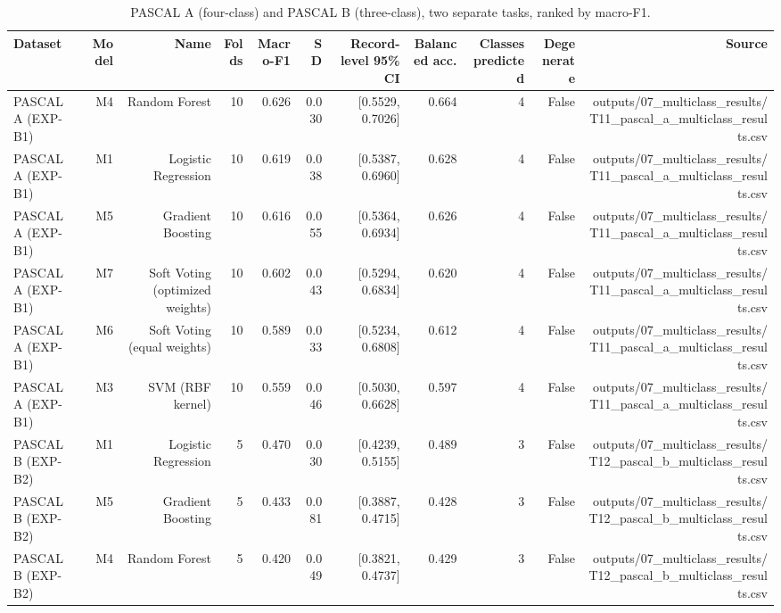 \begin{table}[htbp]
  \centering
  \caption{PASCAL A (four-class) and PASCAL B (three-class), two separate tasks, ranked by macro-F1.}
  \label{tab:q1_t07}
  \begin{tabular}{lrrrrrrrrrr}
    \toprule
    Dataset & Model & Name & Folds & Macro-F1 & SD & Record-level 95\% CI & Balanced acc. & Classes predicted & Degenerate & Source \\
    \midrule
    PASCAL A (EXP-B1) & M4 & Random Forest & 10 & 0.626 & 0.030 & [0.5529, 0.7026] & 0.664 & 4 & False & outputs/07\_multiclass\_results/T11\_pascal\_a\_multiclass\_results.csv \\
    PASCAL A (EXP-B1) & M1 & Logistic Regression & 10 & 0.619 & 0.038 & [0.5387, 0.6960] & 0.628 & 4 & False & outputs/07\_multiclass\_results/T11\_pascal\_a\_multiclass\_results.csv \\
    PASCAL A (EXP-B1) & M5 & Gradient Boosting & 10 & 0.616 & 0.055 & [0.5364, 0.6934] & 0.626 & 4 & False & outputs/07\_multiclass\_results/T11\_pascal\_a\_multiclass\_results.csv \\
    PASCAL A (EXP-B1) & M7 & Soft Voting (optimized weights) & 10 & 0.602 & 0.043 & [0.5294, 0.6834] & 0.620 & 4 & False & outputs/07\_multiclass\_results/T11\_pascal\_a\_multiclass\_results.csv \\
    PASCAL A (EXP-B1) & M6 & Soft Voting (equal weights) & 10 & 0.589 & 0.033 & [0.5234, 0.6808] & 0.612 & 4 & False & outputs/07\_multiclass\_results/T11\_pascal\_a\_multiclass\_results.csv \\
    PASCAL A (EXP-B1) & M3 & SVM (RBF kernel) & 10 & 0.559 & 0.046 & [0.5030, 0.6628] & 0.597 & 4 & False & outputs/07\_multiclass\_results/T11\_pascal\_a\_multiclass\_results.csv \\
    PASCAL B (EXP-B2) & M1 & Logistic Regression & 5 & 0.470 & 0.030 & [0.4239, 0.5155] & 0.489 & 3 & False & outputs/07\_multiclass\_results/T12\_pascal\_b\_multiclass\_results.csv \\
    PASCAL B (EXP-B2) & M5 & Gradient Boosting & 5 & 0.433 & 0.081 & [0.3887, 0.4715] & 0.428 & 3 & False & outputs/07\_multiclass\_results/T12\_pascal\_b\_multiclass\_results.csv \\
    PASCAL B (EXP-B2) & M4 & Random Forest & 5 & 0.420 & 0.049 & [0.3821, 0.4737] & 0.429 & 3 & False & outputs/07\_multiclass\_results/T12\_pascal\_b\_multiclass\_results.csv \\

\end{tabular}
\end{table}
